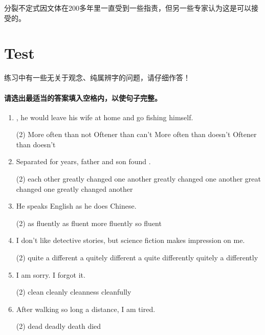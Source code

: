 分裂不定式因文体在200多年里一直受到一些指责，但另一些专家认为这是可以接受的。

\section{Test}

练习中有一些无关于观念、纯属辨字的问题，请仔细作答！

\paragraph{请选出最适当的答案填入空格内，以使句子完整。}

\begin{enumerate}
\item \ttu, he would leave his wife at home and go fishing himself.
  \begin{tasks}(2)
    \task More often than not
    \task Oftener than can't
    \task More often than doesn't
    \task Oftener than doesn't
  \end{tasks}

\item Separated for years, father and son found \ttu.
  \begin{tasks}(2)
    \task each other greatly changed
    \task one another greatly changed
    \task one another great changed
    \task one greatly changed another
  \end{tasks}

\item He speaks English \ttu as he does Chinese.
  \begin{tasks}(2)
    \task as fluently
    \task as fluent
    \task more fluently
    \task so fluent
  \end{tasks}

\item I don't like detective stories, but science fiction makes \ttu impression on me.
  \begin{tasks}(2)
    \task quite a different
    \task a quitely different
    \task a quite differently
    \task quitely a differently
  \end{tasks}

\item I am sorry. I \ttu forgot it.
  \begin{tasks}(2)
    \task clean
    \task cleanly
    \task cleanness
    \task cleanfully
  \end{tasks}

\item After walking so long a distance, I am \ttu tired.
  \begin{tasks}(2)
    \task dead
    \task deadly
    \task death
    \task died
  \end{tasks}


\end{enumerate}
